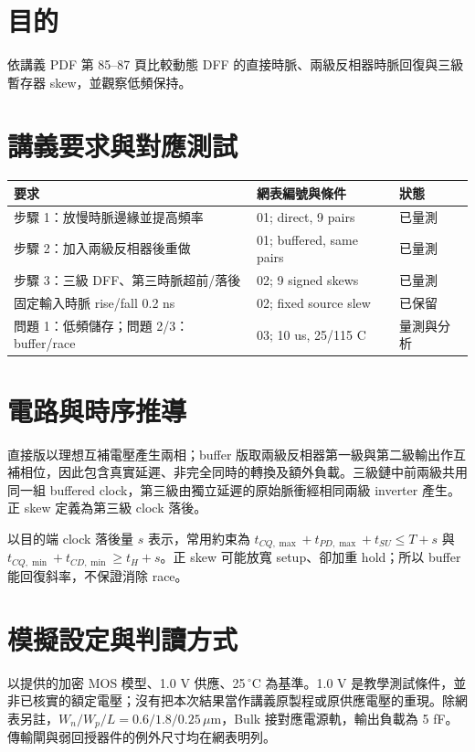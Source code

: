 \section{目的}

依講義 PDF 第 85--87 頁比較動態 DFF 的直接時脈、兩級反相器時脈回復與三級暫存器 skew，並觀察低頻保持。

\section{講義要求與對應測試}

\begin{center}
\small
\setlength{\tabcolsep}{4pt}
\begin{tabular}{p{.42\linewidth}p{.29\linewidth}p{.18\linewidth}}
\toprule
要求 & 網表編號與條件 & 狀態 \\
\midrule
步驟 1：放慢時脈邊緣並提高頻率 & 01; direct, 9 pairs & 已量測 \\
步驟 2：加入兩級反相器後重做 & 01; buffered, same pairs & 已量測 \\
步驟 3：三級 DFF、第三時脈超前/落後 & 02; 9 signed skews & 已量測 \\
固定輸入時脈 rise/fall 0.2 ns & 02; fixed source slew & 已保留 \\
問題 1：低頻儲存；問題 2/3：buffer/race & 03; 10 us, 25/115 C & 量測與分析 \\
\bottomrule
\end{tabular}
\end{center}

\section{電路與時序推導}

直接版以理想互補電壓產生兩相；buffer 版取兩級反相器第一級與第二級輸出作互補相位，因此包含真實延遲、非完全同時的轉換及額外負載。三級鏈中前兩級共用同一組 buffered clock，第三級由獨立延遲的原始脈衝經相同兩級 inverter 產生。正 skew 定義為第三級 clock 落後。

以目的端 clock 落後量 $s$ 表示，常用約束為 $t_{CQ,\max}+t_{PD,\max}+t_{SU}\leq T+s$ 與 $t_{CQ,\min}+t_{CD,\min}\geq t_H+s$。正 skew 可能放寬 setup、卻加重 hold；所以 buffer 能回復斜率，不保證消除 race。

\section{模擬設定與判讀方式}

以提供的加密 MOS 模型、1.0 V 供應、25\,$^\circ$C 為基準。1.0 V 是教學測試條件，並非已核實的額定電壓；沒有把本次結果當作講義原製程或原供應電壓的重現。除網表另註，$W_n/W_p/L=0.6/1.8/0.25\,\mu\mathrm m$，Bulk 接對應電源軌，輸出負載為 5 fF。傳輸閘與弱回授器件的例外尺寸均在網表明列。

